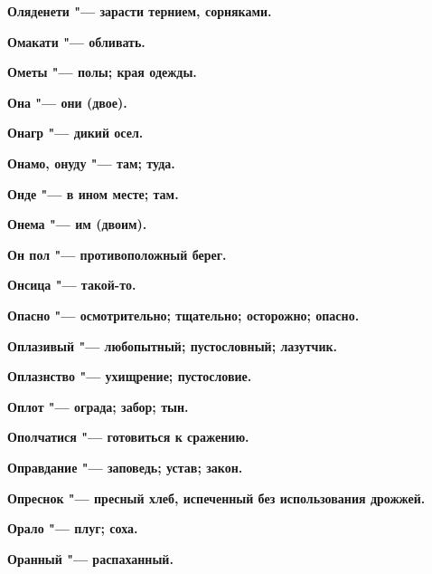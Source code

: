 \begin{multicols}{2}
\bfseries Оляденети\normalfont{} "--- зарасти тернием, сорняками. 




\bfseries Омакати\normalfont{} "--- обливать. 




\bfseries Ометы\normalfont{} "--- полы; края одежды. 




\bfseries Она\normalfont{} "--- они (двое). 




\bfseries Онагр\normalfont{} "--- дикий осел. 




\bfseries Онамо, онуду\normalfont{} "--- там; туда. 




\bfseries Онде\normalfont{} "--- в ином месте; там. 




\bfseries Онема\normalfont{} "--- им (двоим). 




\bfseries Он пол\normalfont{} "--- противоположный берег. 




\bfseries Онсица\normalfont{} "--- такой-то. 




\bfseries Опасно\normalfont{} "--- осмотрительно; тщательно; осторожно; опасно. 




\bfseries Оплазивый\normalfont{} "--- любопытный; пустословный; лазутчик. 




\bfseries Оплазнство\normalfont{} "--- ухищрение; пустословие. 




\bfseries Оплот\normalfont{} "--- ограда; забор; тын. 




\bfseries Ополчатися\normalfont{} "--- готовиться к сражению. 




\bfseries Оправдание\normalfont{} "--- заповедь; устав; закон. 




\bfseries Опреснок\normalfont{} "--- пресный хлеб, испеченный без использования дрожжей. 




\bfseries Орало\normalfont{} "--- плуг; соха. 




\bfseries Оранный\normalfont{} "--- распаханный. 





\end{multicols}
